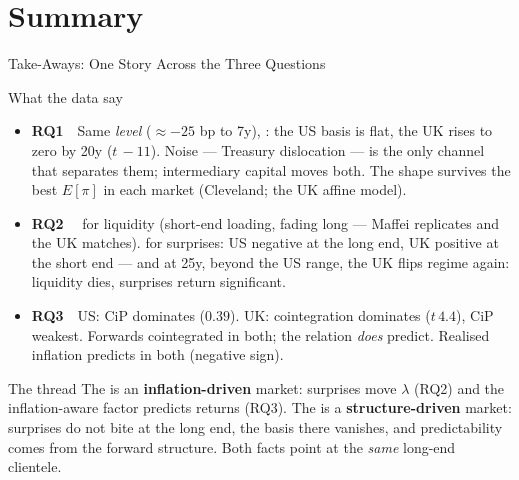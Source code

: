 \section{Summary}

\begin{frame}[t]{Take-Aways: One Story Across the Three Questions}
\vspace{0.1cm}
\small
\begin{block}{What the data say}
\begin{itemize}\itemsep=0.04cm\footnotesize
  \item \textbf{RQ1}\ \ Same \emph{level} ($\approx-25$ bp to 7y), : the
        US basis is flat, the UK rises to zero by 20y ($t\,{-}11$). Noise --- Treasury
        dislocation --- is the only channel that separates them; intermediary capital moves both.
        The shape survives the best $E[\pi]$ in each market (Cleveland; the UK affine model).
  \item \textbf{RQ2}\ \  for liquidity (short-end loading, fading long --- Maffei
        replicates and the UK matches).  for surprises: US negative at the long
        end, UK positive at the short end --- and at 25y, beyond the US range, the UK flips
        regime again: liquidity dies, surprises return significant.
  \item \textbf{RQ3}\ \ US: CiP dominates ($0.39$). UK: cointegration dominates ($t\,4.4$),
        CiP weakest. Forwards cointegrated in both; the relation \emph{does} predict. Realised
        inflation predicts in both (negative sign).
\end{itemize}
\end{block}

\vspace{0.1cm}
\begin{alertblock}{The thread}
\small
The  is an \textbf{inflation-driven} market: surprises move $\lambda$ (RQ2) and the
inflation-aware factor predicts returns (RQ3). The  is a \textbf{structure-driven}
market: surprises do not bite at the long end, the basis there vanishes, and predictability
comes from the forward structure. Both facts point at the \emph{same} long-end clientele.
\end{alertblock}
\end{frame}

